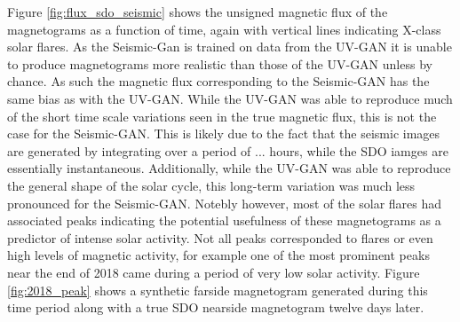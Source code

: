 \documentclass[11pt,a4paper,onecolumn]{report}
\begin{document}
Figure \ref{fig:flux_sdo_seismic} shows the unsigned magnetic flux of the
magnetograms as a function of time, again with vertical lines indicating X-class
solar flares. As the Seismic-Gan is trained on data from the UV-GAN it is unable
to produce magnetograms more realistic than those of the UV-GAN unless by
chance. As such the magnetic flux corresponding to the Seismic-GAN has the same
bias as with the UV-GAN. While the UV-GAN was able to reproduce much of the
short time scale variations seen in the true magnetic flux, this is not the case
for the Seismic-GAN. This is likely due to the fact that the seismic images are generated by
integrating over a period of ... hours, while the SDO iamges are essentially
instantaneous. %
Additionally, while the UV-GAN was able to reproduce the general shape of the
solar cycle, this long-term variation was much less pronounced for the
Seismic-GAN. Notebly however, most of the solar flares had associated peaks
indicating the potential usefulness of these magnetograms as a predictor of
intense solar activity. Not all peaks corresponded to flares or even high levels
of magnetic activity, for example one of the most prominent peaks near the end
of 2018 came during a period of very low solar activity. Figure
\ref{fig:2018_peak} shows a synthetic farside magnetogram generated during this
time period along with a true SDO nearside magnetogram twelve days later.
\end{document}
